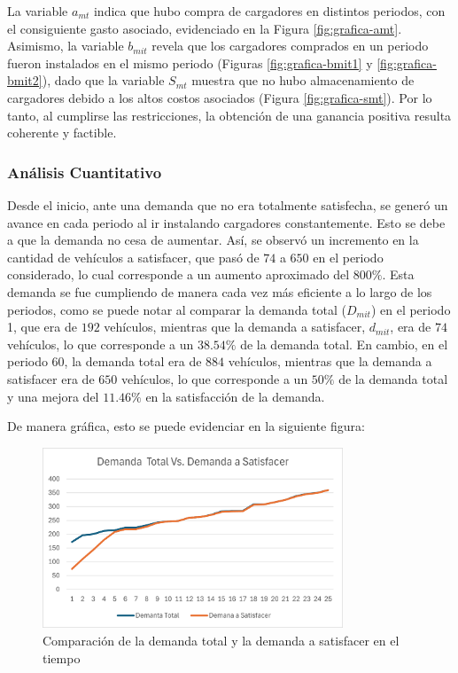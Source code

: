 \documentclass[letterpaper]{article}
\begin{document}
\begin{flushleft}
	La variable \(a_{mt}\) indica que hubo compra de cargadores en distintos periodos, con el consiguiente gasto asociado, evidenciado en la Figura \ref{fig:grafica-amt}. Asimismo, la variable \(b_{mit}\) revela que los cargadores comprados en un periodo fueron instalados en el mismo periodo (Figuras \ref{fig:grafica-bmit1} y \ref{fig:grafica-bmit2}), dado que la variable \(S_{mt}\) muestra que no hubo almacenamiento de cargadores debido a los altos costos asociados (Figura \ref{fig:grafica-smt}). Por lo tanto, al cumplirse las restricciones, la obtención de una ganancia positiva resulta coherente y factible.

	\subsubsection{Análisis Cuantitativo}

	Desde el inicio, ante una demanda que no era totalmente satisfecha, se generó un avance en cada
	periodo al ir instalando cargadores constantemente. Esto se debe a que la demanda no cesa de
	aumentar. Así, se observó un incremento en la cantidad de vehículos a satisfacer, que pasó de
	$74$ a $650$ en el periodo considerado, lo cual corresponde a un aumento aproximado del $800\%$.
	Esta demanda se fue cumpliendo de manera cada vez más eficiente a lo largo de los periodos,
	como se puede notar al comparar la demanda total ($D_{mit}$) en el periodo 1, que era de $192$ vehículos, mientras que la demanda a satisfacer, $d_{mit}$, era de $74$ vehículos, lo que corresponde a un $38.54\%$ de la demanda total. En cambio, en el periodo 60, la demanda total era de $884$ vehículos, mientras que la demanda a satisfacer era de $650$ vehículos, lo que corresponde a un $50\%$ de la demanda total y una mejora del $11.46\%$ en la satisfacción de la demanda.

	De manera gráfica, esto se puede evidenciar en la siguiente figura:

	\begin{figure}[h]
		\centering
		\includegraphics[width=0.8\textwidth]{imagenes/comparacion_demandas.png}
		\caption{Comparación de la demanda total y la demanda a satisfacer en el tiempo}
		\label{fig:comparacion_demanda}
	\end{figure}


\end{flushleft}
\end{document}

